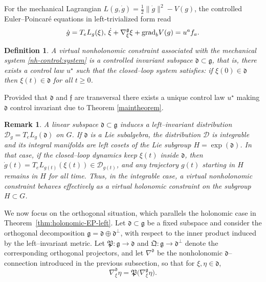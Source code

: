 \documentclass[letterpaper, 10 pt, conference]{ieeeconf}
\newtheorem{definition}{Definition}
\newtheorem{remark}{Remark}
\newcommand{\g}{\mathfrak{g}}
\newcommand{\h}{\mathfrak{d}}
\newcommand{\D}{\mathcal{D}}
\newcommand{\grad}{\normalfont{\text{grad}}}
\begin{document}
For the mechanical Lagrangian $L(g,\dot g)=\tfrac12\|\dot g\|^2 - V(g)$, 
the controlled Euler--Poincar\'e equations in left-trivialized form read
\begin{equation}\label{nh-control:system}
    \dot{g} = T_{e}L_{g}(\xi),\,
    \dot{\xi} 
    + \nabla^{\mathfrak{g}}_{\xi}\xi 
    + \grad_{b} V(g)
    = u^{a}f_{a}.
\end{equation}
\begin{definition}
   A \emph{virtual nonholonomic constraint} associated with the mechanical system 
   \eqref{nh-control:system} is a controlled invariant subspace $\mathfrak{d}\subset\mathfrak{g}$, 
   that is, there exists a control law $u^\star$ such that the closed--loop system 
   satisfies: if $\xi(0)\in\mathfrak{d}$ then $\xi(t)\in\mathfrak{d}$ for all $t\geq 0$.
\end{definition}

Provided that $\mathfrak{d}$ and $\mathfrak{f}$ are transversal there exists a unique control law $u^{\star}$ making $\mathfrak{d}$ control invariant due to Theorem \ref{maintheorem}.

\begin{remark}
A linear subspace $\mathfrak{d}\subset\g$ induces a left--invariant distribution 
$\D_g = T_e L_g(\mathfrak{d})$ on $G$.  
If $\mathfrak{d}$ is a Lie subalgebra, the distribution $\D$ is integrable and 
its integral manifolds are left cosets of the Lie subgroup $H=\exp(\mathfrak{d})$.
In that case, if the closed--loop dynamics keep $\xi(t)$ inside $\mathfrak{d}$, then 
$\dot g(t)=T_eL_{g(t)}(\xi(t))\in\D_{g(t)}$, and any trajectory $g(t)$ starting in $H$ remains in $H$ for all time.  
Thus, in the integrable case, a virtual nonholonomic constraint behaves effectively as a 
virtual holonomic constraint on the subgroup $H\subset G$.
\end{remark}

We now focus on the orthogonal situation, which parallels the holonomic case in 
Theorem~\ref{thm:holonomic-EP-left}. Let $\h\subset\g$ be a fixed subspace and consider the orthogonal decomposition $\g = \h \oplus \h^\perp$, with respect to the inner product induced by the left--invariant metric.  
Let $\mathfrak{P}:\g\to\h$ and $\mathfrak{Q}:\g\to\h^\perp$ denote the corresponding 
orthogonal projectors, and let $\nabla^\h$ be the nonholonomic $\h$--connection 
introduced in the previous subsection, so that for $\xi,\eta\in\h$,
\[
\nabla^\h_{\xi}\eta = \mathfrak{P}\big(\nabla^{\g}_{\xi}\eta\big).
\]
\end{document}
